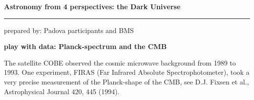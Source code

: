 \documentclass[a4paper,12pt]{article}
\newcommand{\HRule}{\rule{\linewidth}{0.3mm}}
\begin{document}
\pagestyle{empty}

\begin{center}
\LARGE \textbf{Astronomy from 4 perspectives: the Dark Universe}
\HRule
\end{center}
\begin{flushright}
prepared by: Padova participants and BMS
\end{flushright}
\begin{center}
{\Large \textbf{play with data: Planck-spectrum and the CMB}}
\end{center}
\vspace{5mm}

\noindent
The satellite COBE observed the cosmic microwave background from 1989 to 1993. One experiment, FIRAS (Far Infrared Absolute Spectrophotometer), took a very precise measurement of the Planck-shape of the CMB, see D.J. Fixsen et al., Astrophysical Journal 420, 445 (1994).
\end{document}
